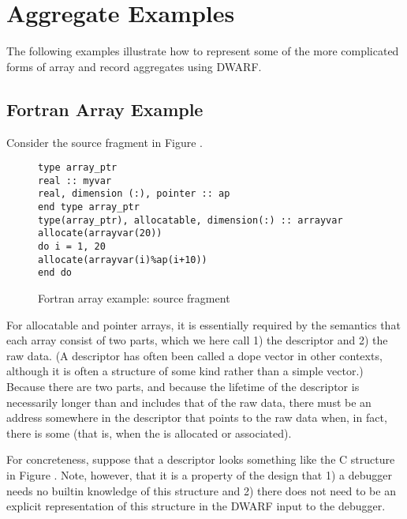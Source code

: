 \clearpage

\section{Aggregate Examples}
\label{app:aggregateexamples}

The following examples illustrate how to represent some of
the more complicated forms of array and record aggregates
using DWARF.

\subsection{Fortran Array Example}
\label{app:fortranarrayexample}
Consider the  source fragment in 
Figure .

\begin{figure}[here]
\begin{lstlisting}
type array_ptr
real :: myvar
real, dimension (:), pointer :: ap
end type array_ptr
type(array_ptr), allocatable, dimension(:) :: arrayvar
allocate(arrayvar(20))
do i = 1, 20
allocate(arrayvar(i)%ap(i+10))
end do
\end{lstlisting}
\caption{Fortran array example: source fragment} \label{fig:fortranarrayexamplesourcefragment}
\end{figure}

For allocatable and pointer arrays, it is essentially required
by the  semantics that each array consist of 
two
parts, which we here call 1) the descriptor and 2) the raw
data. (A descriptor has often been called a dope vector in
other contexts, although it is often a structure of some kind
rather than a simple vector.) Because there are two parts,
and because the lifetime of the descriptor is necessarily
longer than and includes that of the raw data, there must be
an address somewhere in the descriptor that points to the
raw data when, in fact, there is some (that is, when 
the  is allocated or associated).

For concreteness, suppose that a descriptor looks something
like the C structure in 
Figure .
Note, however, that it is
a property of the design that 1) a debugger needs no builtin
knowledge of this structure and 2) there does not need to
be an explicit representation of this structure in the DWARF
input to the debugger.

